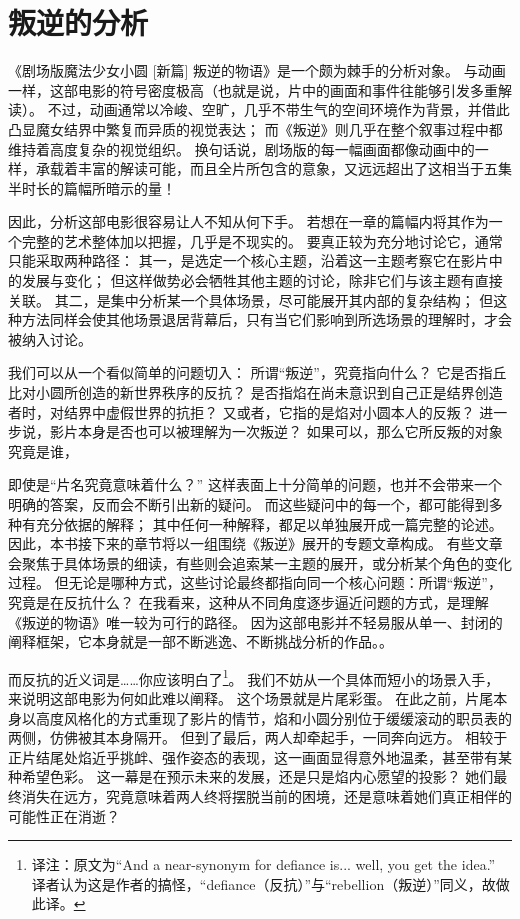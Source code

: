 \chapter{叛逆的分析}
《剧场版魔法少女小圆 [新篇] 叛逆的物语》是一个颇为棘手的分析对象。
与动画一样，这部电影的符号密度极高（也就是说，片中的画面和事件往能够引发多重解读）。
不过，动画通常以冷峻、空旷，几乎不带生气的空间环境作为背景，并借此凸显魔女结界中繁复而异质的视觉表达；
而《叛逆》则几乎在整个叙事过程中都维持着高度复杂的视觉组织。
换句话说，剧场版的每一幅画面都像动画中的一样，承载着丰富的解读可能，而且全片所包含的意象，又远远超出了这相当于五集半时长的篇幅所暗示的量！

因此，分析这部电影很容易让人不知从何下手。
若想在一章的篇幅内将其作为一个完整的艺术整体加以把握，几乎是不现实的。
要真正较为充分地讨论它，通常只能采取两种路径：
其一，是选定一个核心主题，沿着这一主题考察它在影片中的发展与变化；
但这样做势必会牺牲其他主题的讨论，除非它们与该主题有直接关联。
其二，是集中分析某一个具体场景，尽可能展开其内部的复杂结构；
但这种方法同样会使其他场景退居背幕后，只有当它们影响到所选场景的理解时，才会被纳入讨论。

我们可以从一个看似简单的问题切入：
所谓“叛逆”，究竟指向什么？
它是否指丘比对小圆所创造的新世界秩序的反抗？
是否指焰在尚未意识到自己正是结界创造者时，对结界中虚假世界的抗拒？
又或者，它指的是焰对小圆本人的反叛？
进一步说，影片本身是否也可以被理解为一次叛逆？
如果可以，那么它所反叛的对象究竟是谁，

即使是“片名究竟意味着什么？”
这样表面上十分简单的问题，也并不会带来一个明确的答案，反而会不断引出新的疑问。
而这些疑问中的每一个，都可能得到多种有充分依据的解释；
其中任何一种解释，都足以单独展开成一篇完整的论述。
因此，本书接下来的章节将以一组围绕《叛逆》展开的专题文章构成。
有些文章会聚焦于具体场景的细读，有些则会追索某一主题的展开，或分析某个角色的变化过程。
但无论是哪种方式，这些讨论最终都指向同一个核心问题：所谓“叛逆”，究竟是在反抗什么？
在我看来，这种从不同角度逐步逼近问题的方式，是理解《叛逆的物语》唯一较为可行的路径。
因为这部电影并不轻易服从单一、封闭的阐释框架，它本身就是一部不断逃逸、不断挑战分析的作品。。

而反抗的近义词是……你应该明白了\footnote{%
    译注：原文为``And a near-synonym for defiance is... well, you get the idea.''
         译者认为这是作者的搞怪，``defiance（反抗）''与``rebellion（叛逆）''同义，故做此译。
}。
我们不妨从一个具体而短小的场景入手，来说明这部电影为何如此难以阐释。
这个场景就是片尾彩蛋。
在此之前，片尾本身以高度风格化的方式重现了影片的情节，焰和小圆分别位于缓缓滚动的职员表的两侧，仿佛被其本身隔开。
但到了最后，两人却牵起手，一同奔向远方。
相较于正片结尾处焰近乎挑衅、强作姿态的表现，这一画面显得意外地温柔，甚至带有某种希望色彩。
这一幕是在预示未来的发展，还是只是焰内心愿望的投影？
她们最终消失在远方，究竟意味着两人终将摆脱当前的困境，还是意味着她们真正相伴的可能性正在消逝？

